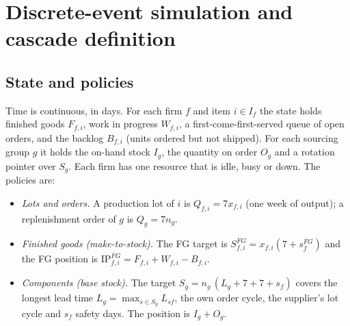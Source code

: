 \documentclass{ifacconf}
\begin{document}
\section{Discrete-event simulation and cascade definition}
\label{sec:des}

\subsection{State and policies}
Time is continuous, in days. For each firm $f$ and item $i\in I_f$ the state holds finished goods $F_{f,i}$, work in progress $W_{f,i}$, a first-come-first-served queue of open orders, and the backlog $B_{f,i}$ (units ordered but not shipped). For each sourcing group $g$ it holds the on-hand stock $I_g$, the quantity on order $O_g$ and a rotation pointer over $S_g$. Each firm has one resource that is idle, busy or down. The policies are:
\begin{itemize}
\item \emph{Lots and orders.} A production lot of $i$ is $Q_{f,i}=7x_{f,i}$ (one week of output); a replenishment order of $g$ is $Q_g=7n_g$.
\item \emph{Finished goods (make-to-stock).} The FG target is $S^{FG}_{f,i}=x_{f,i}(7+s^{FG}_f)$ and the FG position is $\mathrm{IP}^{FG}_{f,i}=F_{f,i}+W_{f,i}-B_{f,i}$.
\item \emph{Components (base stock).} The target $S_g=n_g\,(L_g+7+7+s_f)$ covers the longest lead time $L_g=\max_{s\in S_g}L_{sf}$, the own order cycle, the supplier's lot cycle and $s_f$ safety days. The position is $I_g+O_g$.
\end{itemize}
\end{document}
